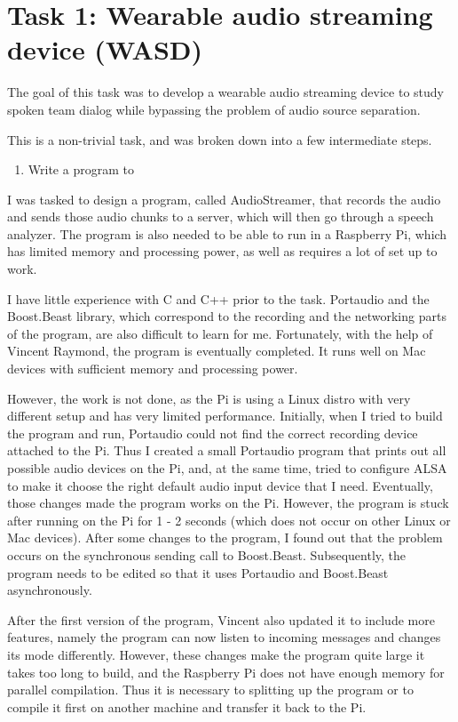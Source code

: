 \section{Task 1: Wearable audio streaming device (WASD)}

The goal of this task was to develop a wearable audio streaming device to
study spoken team dialog while bypassing the problem of audio source
separation.

This is a non-trivial task, and was broken down into a few intermediate steps.

\begin{enumerate}
    \item Write a program to 
\end{enumerate}

I was tasked to design a program, called AudioStreamer, that records the audio
and sends those audio chunks to a server, which will then go through a speech
analyzer. The program is also needed to be able to run in a Raspberry Pi, which
has limited memory and processing power, as well as requires a lot of set up to
work.

I have little experience with C and C++ prior to the task. Portaudio and the
Boost.Beast library, which correspond to the recording and the networking parts
of the program, are also difficult to learn for me. Fortunately, with the help
of Vincent Raymond, the program is eventually completed. It runs well on Mac
devices with sufficient memory and processing power.

However, the work is not done, as the Pi is using a Linux distro with very
different setup and has very limited performance. Initially, when I tried to
build the program and run, Portaudio could not find the correct recording
device attached to the Pi. Thus I created a small Portaudio program that prints
out all possible audio devices on the Pi, and, at the same time, tried to
configure ALSA to make it choose the right default audio input device that I
need. Eventually, those changes made the program works on the Pi. However, the
program is stuck after running on the Pi for 1 - 2 seconds (which does not
occur on other Linux or Mac devices). After some changes to the program, I
found out that the problem occurs on the synchronous sending call to
Boost.Beast. Subsequently, the program needs to be edited so that it uses
Portaudio and Boost.Beast asynchronously.

After the first version of the program, Vincent also updated it to include more
features, namely the program can now listen to incoming messages and changes
its mode differently. However, these changes make the program quite large it
takes too long to build, and the Raspberry Pi does not have enough memory for
parallel compilation. Thus it is necessary to splitting up the program or to
compile it first on another machine and transfer it back to the Pi.

